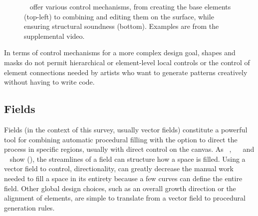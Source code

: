 \begin{figure}[t]
    \centering
    \caption{\label{fig:zehnder_2016_dso}\citeauthor*{zehnder_2016_dso}~\cite{zehnder_2016_dso} offer various control mechanisms, from creating the base elements (top-left) to combining and editing them on the surface, while ensuring structural soundness (bottom). Examples are from the supplemental video.}
\end{figure}

In terms of control mechanisms for a more complex design goal, shapes and masks do not permit hierarchical or element-level local controls or the control of element connections needed by artists who want to generate patterns creatively without having to write code.


\subsection{Fields}
\label{subsubsec:analysis_creative_means_fields}

Fields (in the context of this survey, usually vector fields) constitute a powerful tool for combining automatic procedural filling with the option to direct the process in specific regions, usually with direct control on the canvas. As \citeauthor*{hsu_2020_aef}~\cite{hsu_2020_aef}, ~\citeauthor*{saputra_2017_ffo}~\cite{saputra_2017_ffo} and \citeauthor*{gieseke_2017_ooo}~\cite{gieseke_2017_ooo} show (), the streamlines of a field can structure how a space is filled. Using a vector field to control, \eg directionality, can greatly decrease the manual work needed to fill a space in its entirety because a few curves can define the entire field. Other global design choices, such as an overall growth direction or the alignment of elements, are simple to translate from a vector field to procedural generation rules.

